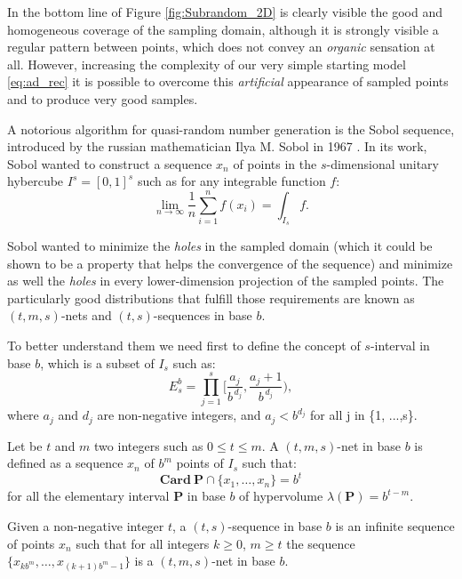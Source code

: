\documentclass[12pt,a4paper]{report}
\begin{document}
    In the bottom line of Figure \ref{fig:Subrandom_2D} is clearly visible the good and homogeneous coverage of the sampling domain, although it is strongly visible a regular pattern between points, which does not convey an \textit{organic} sensation at all. However, increasing the complexity of our very simple starting model \ref{eq:ad_rec} it is possible to overcome this \textit{artificial} appearance of sampled points and to produce very good samples.

    A notorious algorithm for quasi-random number generation is the Sobol sequence, introduced by the russian mathematician Ilya M. Sobol in 1967 \cite{SOBOL2001271}. In its work, Sobol wanted to construct a sequence $x_n$ of points in the $s$-dimensional unitary hybercube $I^s = [0,1]^s$ such as for any integrable function $f$:
    \begin{equation}
        \lim_{n\to\infty} \frac{1}{n} \sum_{i=1}^{n} f(x_i) = \int_{I_s} f.
    \end{equation}

    Sobol wanted to minimize the \textit{holes} in the sampled domain (which it could be shown to be a property that helps the convergence of the sequence) and minimize as well the \textit{holes} in every lower-dimension projection of the sampled points. The particularly good distributions that fulfill those requirements are known as $(t,m,s)$-nets and $(t,s)$-sequences in base $b$.

    To better understand them we need first to define the concept of $s$-interval in base $b$, which is a subset of $I_s$ such as:
    \begin{equation}
        E_s^b = \prod_{j=1}^{s} \Bigg[ \frac{a_j}{b^{\,d_j}}, \frac{a_j + 1}{b^{\,d_j}}\Bigg),
    \end{equation}
    where $a_j$ and $d_j$ are non-negative integers, and $a_j < b^{d_j}$ for all j in \{1, ...,s\}.

    Let be $t$ and $m$ two integers such as $0 \leq t \leq m$. A $(t,m,s)$-net in base $b$ is defined as a sequence $x_n$ of $b^m$ points of $I_s$ such that:
    \begin{equation}
        \mathbf{Card} \ \mathbf{P} \cap \{x_1, \dots, x_n \} = b^t
    \end{equation}
    for all the elementary  interval $\mathbf{P}$ in base $b$ of hypervolume $\lambda(\mathbf{P}) =  b^{t-m}$.

    Given a non-negative integer $t$, a $(t,s)$-sequence in base $b$ is an infinite sequence of points $x_n$ such that for all integers $k \geq 0$, $m \geq t$ the sequence $ \{ x_{kb^m}, \dots, x_{(k+1)b^m-1} \}$ is a $(t,m,s)$-net in base $b$.
\end{document}
